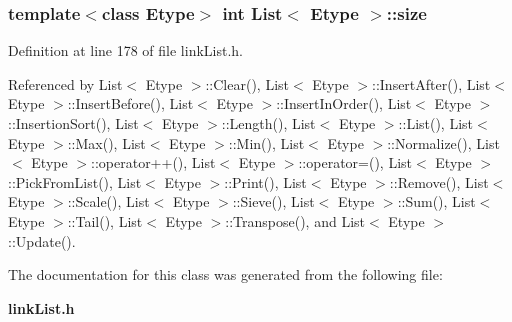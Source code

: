 \subsubsection{\setlength{\rightskip}{0pt plus 5cm}template$<$class Etype$>$ int {\bf List}$<$ Etype $>$::{\bf size}\hspace{0.3cm}{\tt  [protected]}}\label{classList_p2}




Definition at line 178 of file link\-List.h.

Referenced by List$<$ Etype $>$::Clear(), List$<$ Etype $>$::Insert\-After(), List$<$ Etype $>$::Insert\-Before(), List$<$ Etype $>$::Insert\-In\-Order(), List$<$ Etype $>$::Insertion\-Sort(), List$<$ Etype $>$::Length(), List$<$ Etype $>$::List(), List$<$ Etype $>$::Max(), List$<$ Etype $>$::Min(), List$<$ Etype $>$::Normalize(), List$<$ Etype $>$::operator++(), List$<$ Etype $>$::operator=(), List$<$ Etype $>$::Pick\-From\-List(), List$<$ Etype $>$::Print(), List$<$ Etype $>$::Remove(), List$<$ Etype $>$::Scale(), List$<$ Etype $>$::Sieve(), List$<$ Etype $>$::Sum(), List$<$ Etype $>$::Tail(), List$<$ Etype $>$::Transpose(), and List$<$ Etype $>$::Update().

The documentation for this class was generated from the following file:\begin{CompactItemize}
\item 
{\bf link\-List.h}\end{CompactItemize}

